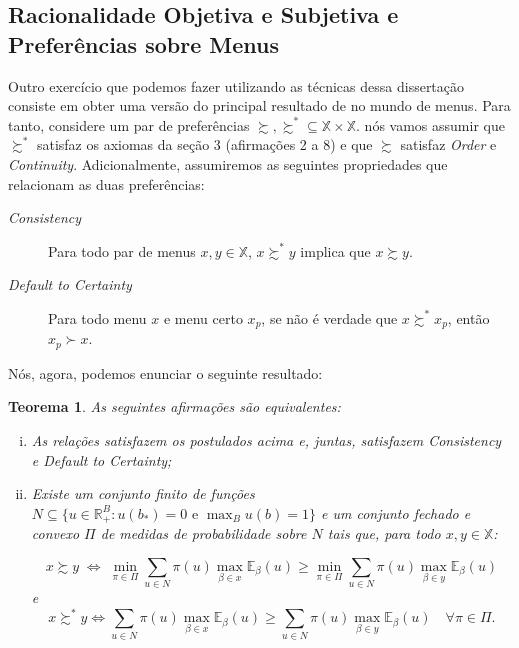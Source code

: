 \documentclass[11pt, a4paper]{article}
\theoremstyle{nonumberplain}
\theoremstyle{plain}
\newtheorem{theorem}{Teorema}
\theoremstyle{plain}
\theoremstyle{plain}
\begin{document}
\subsection{Racionalidade Objetiva e Subjetiva e Preferências sobre Menus}
Outro exercício que podemos fazer utilizando as técnicas dessa dissertação consiste em obter uma versão do principal resultado de \cite{Gilboa2010} no mundo de menus. Para tanto, considere um par de preferências $\succsim, \succsim^*\subseteq\mathbb{X}\times\mathbb{X}$. nós vamos assumir que $\succsim^*$ satisfaz os axiomas da seção 3 (afirmações 2 a 8) e que $\succsim$ satisfaz \emph{Order} e \emph{Continuity}. Adicionalmente, assumiremos as seguintes propriedades que relacionam as duas preferências:
\begin{description}
\item [\textit{Consistency}] Para todo par de menus $x,y\in\mathbb{X}$, $x\succsim^*y$ implica que $x\succsim y$.

\item[\textit{Default to Certainty}] Para todo menu $x$ e menu certo $x_p$, se não é verdade que $x\succsim^* x_p$, então $x_p \succ x$.

\end{description}

Nós, agora, podemos enunciar o seguinte resultado:\\

\begin{theorem}
As seguintes afirmações são equivalentes:
\begin{enumerate}[(i)]
\item As relações satisfazem os postulados acima e, juntas, satisfazem \emph{Consistency} e \emph{Default to Certainty};

\item Existe um conjunto finito de funções $N\subseteq\{u \in \mathbb{R}^B_+:u(b_*)=0\text { e }\max_{B}u(b)=1\}$ e um conjunto fechado e convexo $\Pi$ de medidas de probabilidade sobre $N$ tais que, para todo $x,y\in\mathbb{X}$:

\[x \succsim y \;\Leftrightarrow\; \min_{\pi\in\Pi}\sum_{u\in N} \pi(u)\max_{\beta\in x}\mathbb{E}_\beta(u)\geq \min_{\pi\in\Pi}\sum_{u\in N} \pi(u)\max_{\beta\in y}\mathbb{E}_\beta(u)\]
e
$$x\succsim^* y \Leftrightarrow \sum_{u\in N} \pi(u)\max_{\beta\in x}\mathbb{E}_\beta(u) \geq \sum_{u\in N} \pi(u)\max_{\beta\in y}\mathbb{E}_\beta(u)\quad \forall\pi\in\Pi.$$
\end{enumerate}
\end{theorem}
\end{document}

